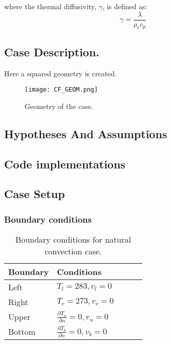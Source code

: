 where the thermal diffusivity, $\gamma$, is defined as:
\begin{equation}
	\gamma=\frac{\lambda}{\rho_{r} c_{p}}
\end{equation}

\subsection{Case Description.}
Here a squared geometry is created.
\begin{figure}[h!]
	\centering
	\texttt{[image: CF\_GEOM.png]}	
	\label{}
	\caption{Geometry of the case.}
\end{figure} 

\subsection{Hypotheses And Assumptions}

\subsection{Code implementations}
\subsection{Case Setup}
\subsubsection*{Boundary conditions}
\begin{table}[h!]
	\begin{tabular}{@{}lllll@{}}
		\toprule[1pt]
		\textbf{Boundary} & \textbf{Conditions}  \\ \midrule[2pt]
		Left & $T_{l}=283, v_{l} = 0   $  \\
		Right & $T_{r}=273, v_{r} = 0 $ \\
		Upper & $\frac{\partial T_{u}}{\partial n} = 0, v_{u} = 0$  \\
		Bottom & $\frac{\partial T_{b}}{\partial n} = 0, v_{b} = 0$  \\ \bottomrule[1pt]		
	\end{tabular}
	\centering
	\caption{Boundary conditions for natural convection case.}	
	\label{fig:boundaryCdsNaturalConvection}
\end{table}


